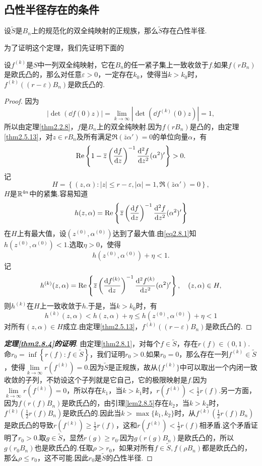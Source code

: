\subsection{凸性半径存在的条件}
\begin{theorem}\label{thm2.8.4}
	设$\tilde{S}$是$B_n$上的规范化的双全纯映射的正规族，那么$\tilde{S}$存在凸性半径.
\end{theorem}
为了证明这个定理，我们先证明下面的
\begin{lemma}\label{lem2.8.5}
	设$f^{(k)}$是$S$中一列双全纯映射，它在$B_n$的任一紧子集上一致收敛于$f$.如果$f(rB_n)$是欧氏凸的，那么对任意$\varepsilon>0$，一定存在$k_0$，使得当$k>k_0$时，$f^{(k)}((r-\varepsilon)B_n)$是欧氏凸的.
\end{lemma}
\begin{proof}
	因为
	\[\left|\det\left(\dd{f(0)}{z}\right)\right|=\lim_{k\to\infty}\left|\det\left(\dd{f^{(k)}(0)}{z}\right)\right|=1,\]
	所以由定理\ref{thm2.2.8}，$f$是$B_n$上的双全纯映射.因为$f(rB_n)$是凸的，由定理\ref{thm2.5.13}，对$z\in rB_n$及所有满足$\Re(\bar{z}\alpha')=0$的单位向量$\alpha$，有
	\begin{equation}\label{eq2.8.1}
	\operatorname{Re}\left\{1-{}\mkern1mu\overline{\mkern-1muz}\left(\frac{\mathop{}\!\mathrm df}{\mathop{}\!\mathrm dz}\right)^{-1}\frac{\mathop{}\!\mathrm d^2f}{\mathop{}\!\mathrm dz^2}(\alpha^2)'\right\}>0.
	\end{equation}
记
\[H=\left\{(z,\alpha)\colon |z|\le r-\varepsilon,|\alpha|=1,\Re(\bar{z}\alpha')=0\right\},\]
$H$是$\mathbb R^{4n}$中的紧集.容易知道
\[h(z,\alpha)=\operatorname{Re}\left\{{}\mkern1mu\overline{\mkern-1muz}\left(\frac{\mathop{}\!\mathrm df}{\mathop{}\!\mathrm dz}\right)^{-1}\frac{\mathop{}\!\mathrm d^2f}{\mathop{}\!\mathrm dz^2}(\alpha^2)'\right\}\]
在$H$上有最大值，设$(z^{(0)},\alpha^{(0)})$达到了最大值.由\eqref{eq2.8.1}知$h(z^{(0)},\alpha^{(0)})<1$.选取$\eta>0$，使得
\[h(z^{(0)},\alpha^{(0)})+\eta<1.\]
记
\[h^{(k)}(z,\alpha)=\operatorname{Re}\left\{{}\mkern1mu\overline{\mkern-1muz}\left(\frac{\mathop{}\!\mathrm df^{(k)}}{\mathop{}\!\mathrm dz}\right)^{-1}\frac{\mathop{}\!\mathrm d^2f^{(k)}}{\mathop{}\!\mathrm dz^2}(\alpha^2)'\right\},\quad (z,\alpha)\in H,\]
则$h^{(k)}$在$H$上一致收敛于$h$.于是，当$k>k_0$时，有
\[h^{(k)}(z,\alpha)<h(z,\alpha)+\eta\le h(z^{(0)},\alpha^{(0)})+\eta<1\]
对所有$(z,\alpha)\in H$成立.由定理\ref{thm2.5.13}，$f^{(k)}((r-\varepsilon)B_n)$是欧氏凸的.
\end{proof}
\begin{proof}[\textbf{定理\ref{thm2.8.4}的证明}]
	由定理\ref{thm2.8.1}，对每个$f\in\tilde{S}$，存在$r(f)\in(0,1)$.\\
	命$r_0=\inf\left\{r(f)\colon f\in\tilde{S}\right\}$，我们证明$r_0>0$.如果$r_0=0$，那么存在一列$f^{(k)}\in\tilde{S}$，使得$\lim\limits_{k\to\infty} r(f^{(k)})=0$.因为$\tilde{S}$是正规族，故从$\{f^{(k)}\}$中可以取出一个内闭一致收敛的子列，不妨设这个子列就是它自己，它的极限映射是$f$.因为$\lim\limits_{k\to\infty} r(f^{(k)})=0$，所以存在$k_1$，当$k>k_1$时，$r(f^{(k)})<\frac12 r(f)$.另一方面，因为$f(r(f)B_n)$是欧氏凸的，由引理\ref{lem2.8.5}存在$k_2$，当$k>k_2$时，$f^{(k)}\left(\frac12 r(f) B_n\right)$是欧氏凸的.因此当$k>\max\{k_1,k_2\}$时，从$f^{(k)}\left(\frac12 r(f)B_n\right)$是欧氏凸的导致$r(f^{(k)})\ge\frac12 r(f)$，这和$r(f^{(k)})<\frac12 r(f)$相矛盾.这个矛盾证明了$r_0>0$.取$g\in\tilde{S}$，显然$r(g)\ge r_0$.因为$g(r(g)B_n)$是欧氏凸的，所以$g(r_0 B_n)$也是欧氏凸的.任取$\rho>r_0$，如果对所有$f\in\tilde{S},f(\rho B_n)$都是欧氏凸的，那么$\rho\le r_0$，这不可能.因此$r_0$是$\tilde{S}$的凸性半径.
\end{proof}
